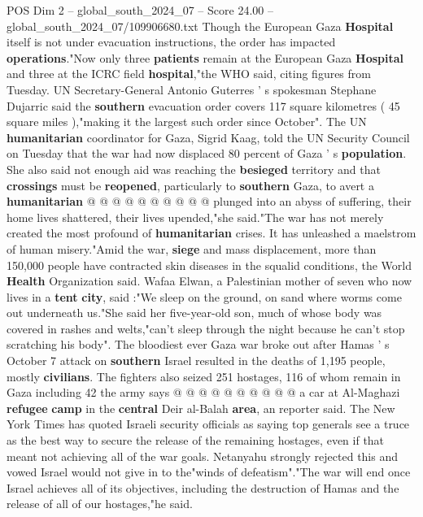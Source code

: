 \begin{textsample}{POS Dim 2 – global\_south\_2024\_07 – Score 24.00 – global\_south\_2024\_07/109906680.txt}
Though the European Gaza \textbf{Hospital} itself is not under evacuation instructions, the order has impacted \textbf{operations}."Now only three \textbf{patients} remain at the European Gaza \textbf{Hospital} and three at the ICRC field \textbf{hospital},"the WHO said, citing figures from Tuesday.
UN Secretary-General Antonio Guterres ' s spokesman Stephane Dujarric said the \textbf{southern} evacuation order covers 117 square kilometres ( 45 square miles ),"making it the largest such order since October".
The UN \textbf{humanitarian} coordinator for Gaza, Sigrid Kaag, told the UN Security Council on Tuesday that the war had now displaced 80 percent of Gaza ' s \textbf{population}.
She also said not enough aid was reaching the \textbf{besieged} territory and that \textbf{crossings} must be \textbf{reopened}, particularly to \textbf{southern} Gaza, to avert a \textbf{humanitarian} @ @ @ @ @ @ @ @ @ @ plunged into an abyss of suffering, their home lives shattered, their lives upended,"she said."The war has not merely created the most profound of \textbf{humanitarian} crises.
It has unleashed a maelstrom of human misery."Amid the war, \textbf{siege} and mass displacement, more than 150,000 people have contracted skin diseases in the squalid conditions, the World \textbf{Health} Organization said.
Wafaa Elwan, a Palestinian mother of seven who now lives in a \textbf{tent} \textbf{city}, said :"We sleep on the ground, on sand where worms come out underneath us."She said her five-year-old son, much of whose body was covered in rashes and welts,"can't sleep through the night because he can't stop scratching his body".
The bloodiest ever Gaza war broke out after Hamas ' s October 7 attack on \textbf{southern} Israel resulted in the deaths of 1,195 people, mostly \textbf{civilians}.
The fighters also seized 251 hostages, 116 of whom remain in Gaza including 42 the army says @ @ @ @ @ @ @ @ @ @ a car at Al-Maghazi \textbf{refugee} \textbf{camp} in the \textbf{central} Deir al-Balah \textbf{area}, an reporter said.
The New York Times has quoted Israeli security officials as saying top generals see a truce as the best way to secure the release of the remaining hostages, even if that meant not achieving all of the war goals.
Netanyahu strongly rejected this and vowed Israel would not give in to the"winds of defeatism"."The war will end once Israel achieves all of its objectives, including the destruction of Hamas and the release of all of our hostages,"he said.

\end{textsample}
